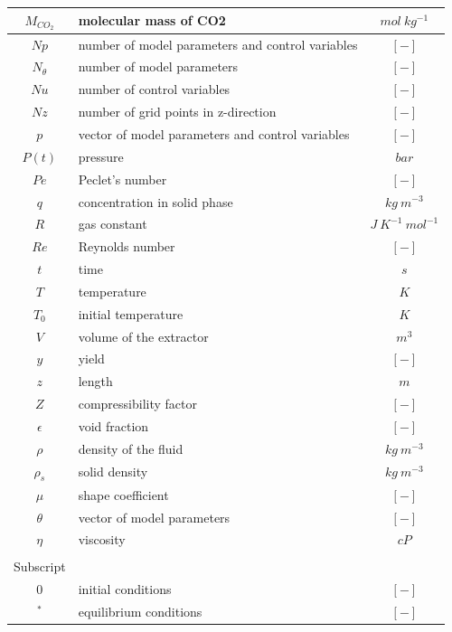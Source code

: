 \documentclass[a4paper,fleqn]{cas-dc}
\begin{document}
\begin{table}[p]
\begin{tabular}{ |c|l|c| }
			$M_{CO_2}$	&	molecular mass of CO2					& $mol ~ kg^{-1}$			\\ \hline
			$Np$		&	number of model parameters and control variables & $[-]$			\\ \hline
			$N_{\theta}$&	number of model parameters				& $[-]$						\\ \hline
			$Nu$		&	number of control variables				& $[-]$						\\ \hline
			$Nz$		&	number of grid points in z-direction	& $[-]$						\\ \hline
			$p$			&	vector of model parameters and control variables	& $[-]$			\\ \hline
			$P(t)$		&	pressure								& $bar$						\\ \hline
			$Pe$		&	Peclet's number							& $[-]$						\\ \hline
			$q$			&	concentration in solid phase			& $kg ~ m^{-3}$				\\ \hline
			$R$			&	gas constant							& $J ~ K^{-1} ~ mol^{-1}$	\\ \hline
			$Re$		&	Reynolds number							& $[-]$						\\ \hline
			$t$			&	time									& $s$						\\ \hline
			$T$			&	temperature								& $K$						\\ \hline
			$T_0$		&	initial temperature						& $K$						\\ \hline
			$V$			&	volume of the extractor					& $m^3$						\\ \hline
			$y$			&	yield	 								& $[-]$						\\ \hline
			$z$			&	length									& $m$						\\ \hline
			$Z$			&	compressibility	factor					& $[-]$						\\ \hline
			$\epsilon$	&	void fraction							& $[-]$						\\ \hline
			$\rho$		&	density of the fluid					& $kg ~ m^{-3}$				\\ \hline
			$\rho_s$	&	solid density							& $kg ~ m^{-3}$				\\ \hline
			$\mu$		&	shape coefficient						& $[-]$						\\ \hline
			$\theta$	&	vector of model parameters				& $[-]$						\\ \hline
			$\eta$		&	viscosity								& $cP$						\\ \hline				
						& 											&							\\ \hline			
		 	Subscript	& 											&							\\ \hline
			$0$			&	initial conditions						& $[-]$						\\ \hline
			$^*$		&	equilibrium conditions					& $[-]$						\\ \hline							
		\end{tabular}
\end{table}
\end{document}
